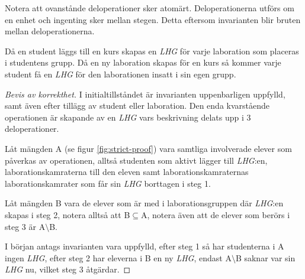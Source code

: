 Notera att ovanstånde deloperationer sker atomärt. Deloperationerna utförs om en enhet och ingenting sker mellan stegen. Detta eftersom invarianten blir bruten mellan deloperationerna.

Då en student läggs till en kurs skapas en \emph{LHG} för varje laboration som placeras i studentens grupp. Då en ny laboration skapas för en kurs så kommer varje student få en \emph{LHG} för den laborationen insatt i sin egen grupp.

\begin{proof}[Bevis av korrekthet]
I initialtillståndet är invarianten uppenbarligen uppfylld, samt även efter tillägg av student eller laboration. Den enda kvarstående operationen är skapande av en \emph{LHG} vars beskrivning delats upp i 3 deloperationer. 

Låt mängden A (se figur \ref{fig:strict-proof}) vara samtliga involverade elever som påverkas av operationen, alltså studenten som aktivt lägger till \emph{LHG}:en, laborationskamraterna till den eleven samt laborationskamraternas laborationskamrater som får sin \emph{LHG} borttagen i steg 1. 

Låt mängden B vara de elever som är med i laborationsgruppen där \emph{LHG}:en skapas i steg 2, notera alltså att B$\subseteq$A, notera även att de elever som berörs i steg 3 är A$\setminus$B.

I början antags invarianten vara uppfylld, efter steg 1 så har studenterna i A ingen \emph{LHG}, efter steg 2 har eleverna i B en ny \emph{LHG}, endast A$\setminus$B saknar var sin \emph{LHG} nu, vilket steg 3 åtgärdar. \qedhere
\end{proof}
 
